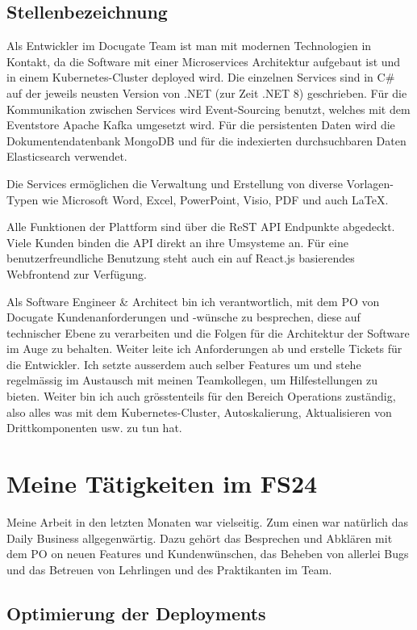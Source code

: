 \documentclass{bpraxis}
\begin{document}
\subsection{Stellenbezeichnung}

Als Entwickler im Docugate Team ist man mit modernen Technologien in Kontakt, da die Software mit einer Microservices Architektur aufgebaut ist und in einem Kubernetes-Cluster deployed wird.
Die einzelnen Services sind in C\# auf der jeweils neusten Version von .NET (zur Zeit .NET 8) geschrieben.
Für die Kommunikation zwischen Services wird Event-Sourcing benutzt, welches mit dem Eventstore Apache Kafka umgesetzt wird.
Für die persistenten Daten wird die Dokumentendatenbank MongoDB und für die indexierten durchsuchbaren Daten Elasticsearch verwendet.

Die Services ermöglichen die Verwaltung und Erstellung von diverse Vorlagen-Typen wie Microsoft Word, Excel, PowerPoint, Visio, PDF und auch LaTeX.

Alle Funktionen der Plattform sind über die ReST API Endpunkte abgedeckt. Viele Kunden binden die API direkt an ihre Umsysteme an.
Für eine benutzerfreundliche Benutzung steht auch ein auf React.js basierendes Webfrontend zur Verfügung.

Als Software Engineer & Architect bin ich verantwortlich, mit dem PO von Docugate Kundenanforderungen und -wünsche zu besprechen, diese auf technischer Ebene zu verarbeiten und die Folgen für die
Architektur der Software im Auge zu behalten. Weiter leite ich Anforderungen ab und erstelle Tickets für die Entwickler. Ich setzte ausserdem auch selber Features um und stehe regelmässig im Austausch
mit meinen Teamkollegen, um Hilfestellungen zu bieten. Weiter bin ich auch grösstenteils für den Bereich Operations zuständig, also alles was mit dem Kubernetes-Cluster, Autoskalierung, Aktualisieren von
Drittkomponenten usw. zu tun hat.

\section{Meine Tätigkeiten im FS24}

Meine Arbeit in den letzten Monaten war vielseitig. Zum einen war natürlich das Daily Business allgegenwärtig. Dazu gehört das Besprechen und Abklären mit dem PO on neuen Features und Kundenwünschen,
das Beheben von allerlei Bugs und das Betreuen von Lehrlingen und des Praktikanten im Team.

\subsection{Optimierung der Deployments}
\end{document}
